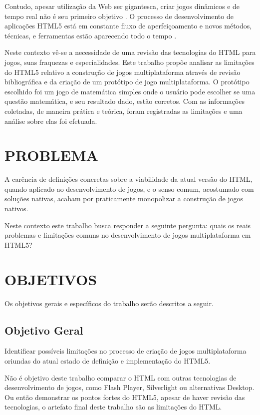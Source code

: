 Contudo, apesar utilização da Web ser gigantesca, criar
jogos dinâmicos e de tempo real não é seu primeiro objetivo
\autocite{html5mostwanted}. O processo de desenvolvimento de
aplicações HTML5 está em constante fluxo de aperfeiçoamento e novos
métodos, técnicas, e ferramentas estão aparecendo todo o tempo
\autocite{crossPlatformMobileGame}.

Neste contexto vê-se a necessidade de uma revisão das tecnologias do
HTML para jogos, suas fraquezas e especialidades. Este trabalho propõe
analisar as limitações do HTML5 relativo a construção de jogos
multiplataforma através de revisão bibliográfica e da criação de um
protótipo de jogo multiplataforma. O protótipo escolhido foi um jogo
de matemática simples onde o usuário pode escolher se uma questão
matemática, e seu resultado dado, estão corretos. Com as informações
coletadas, de maneira prática e teórica, foram registradas as limitações
e uma análise sobre elas foi efetuada.

\section{PROBLEMA}
A carência de definições concretas sobre a viabilidade da atual
versão do HTML, quando aplicado ao desenvolvimento de jogos, e o senso
comum, acostumado com soluções nativas, acabam por praticamente
monopolizar a construção de jogos nativos.

Neste contexto este trabalho busca responder a seguinte pergunta: quais os
reais problemas e limitações comuns no desenvolvimento de jogos
multiplataforma em HTML5?

\section{OBJETIVOS}

Os objetivos gerais e específicos do trabalho serão descritos a seguir.

\subsection{Objetivo Geral}

Identificar possíveis limitações no processo de criação de
jogos multiplataforma oriundas do atual estado de definição e
implementação do HTML5.

Não é objetivo deste trabalho comparar o HTML com outras tecnologias
de desenvolvimento de jogos, como Flash Player, Silverlight ou
alternativas Desktop. Ou então demonstrar os pontos fortes do HTML5,
apesar de haver revisão das tecnologias, o artefato final deste
trabalho são as limitações do HTML.


